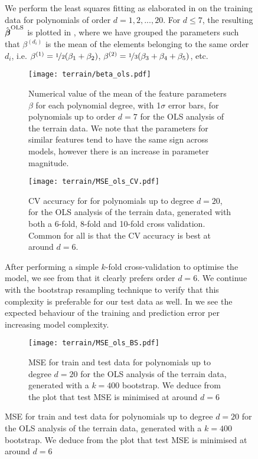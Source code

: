 \begin{figure}
        We perform the least squares fitting as elaborated in  on the training data for polynomials of order $d=1,2,..., 20$. For $d\leq 7$, the resulting $\hat{\boldsymbol{\beta}}^\text{OLS}$ is plotted in , where we have grouped the parameters such that $\beta^{(d_i)}$ is the mean of the elements belonging to the same order $d_i$, i.e. $\beta^{(1)} = \nicefrac{1}{2}(\beta_1 + \beta_2)$, $\beta^{(2)} = \nicefrac{1}{3}(\beta_3 + \beta_4 + \beta_5)$, etc. 

        \begin{figure}
            \texttt{[image: terrain/beta\_ols.pdf]}
            \caption{Numerical value of the mean of the feature parameters $\beta$ for each polynomial degree, with 1$\sigma$ error bars, for polynomials up to order $d=7$ for the OLS analysis of the terrain data. We note that the parameters for similar features tend to have the same sign across models, however there is an increase in parameter magnitude.}
            \label{fig:gc_beta_with_standard_deviation}
        \end{figure}

        
        \begin{figure}
            \texttt{[image: terrain/MSE\_ols\_CV.pdf]}
            \caption{CV accuracy for for polynomials up to degree $d=20$, for the OLS analysis of the terrain data, generated with both a 6-fold, 8-fold and 10-fold cross validation. Common for all is that the CV accuracy is best at around $d=6$.}
            \label{fig:gc_cv_errors_ols}
        \end{figure}

        After performing a simple $k$-fold cross-validation to optimise the model, we see from  that it clearly prefers order $d=6$. We continue with the bootstrap resampling technique to verify that this complexity is preferable for our test data as well. In  we see the expected behaviour of the training and prediction error per increasing model complexity.
        

        \begin{figure}
            \texttt{[image: terrain/MSE\_ols\_BS.pdf]}
            \caption{MSE for train and test data for polynomials up to degree $d=20$ for the OLS analysis of the terrain data, generated with a $k=400$ bootstrap. We deduce from the plot that test MSE is minimised at around $d=6$}
            \label{fig:gc_model_complexity_ols}
        \end{figure}


\end{figure}
